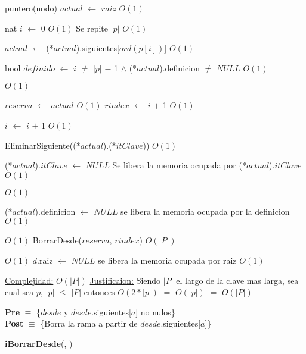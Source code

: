 \begin{Algoritmos}
\begin{algorithm}[H]
\begin{algorithmic}[1]
\State puntero(nodo) $actual$ $\gets$ $raiz$ \Comment $O(1)$

\State nat $i$ $\gets$ 0 \Comment $O(1)$
   \Comment Se repite $|p|$ $O(1)$



	\State $actual$ $\gets$ (*$actual$).siguientes[$ord(p[i])$] \Comment $O(1)$

	\State bool $definido$ $\gets$ $i$ $\neq$ $|p|$ $-$ 1 $\land$ (*$actual$).definicion $\neq$ $NULL$ \Comment $O(1)$

	 \Comment $O(1)$

	\State $reserva$ $\gets$ $actual$ \Comment $O(1)$
	\State $rindex$ $\gets$ $i$ $+$ 1 \Comment $O(1)$

	\EndIf

	\State $i$ $\gets$ $i$ $+$ 1 \Comment $O(1)$
\EndWhile


\State EliminarSiguiente((*$actual$).(*$itClave$)) \Comment $O(1)$

\State (*$actual$).$itClave$ $\gets$ $NULL$ \Comment Se libera la memoria ocupada por (*$actual$).$itClave$ $O(1)$

 \Comment $O(1)$

	\State (*$actual$).definicion $\gets$ $NULL$ \Comment se libera la memoria ocupada por la definicion $O(1)$

\EndIf

 \Comment $O(1)$
	\State BorrarDesde($reserva$, $rindex$) \Comment $O(|P|)$
\EndIf


 \Comment $O(1)$
	\State $d$.raiz $\gets$ $NULL$ \Comment se libera la memoria ocupada por raiz $O(1)$
\EndIf


\medskip
\State \underline{Complejidad:} $O(|P|)$
\State \underline{Justificaion:} Siendo $|P|$ el largo de la clave mas larga, sea cual sea $p$, $|p|$ $\leq$ $|P|$ entonces $O(2*|p|)$ $=$	$O(|p|)$ $=$ $O(|P|)$

\end{algorithmic}
\end{algorithm}

\pagebreak

\textbf{Pre} $\equiv$ \{$desde$ y $desde$.siguientes[$a$] no nulos\}\\%
\textbf{Post} $\equiv$ \{Borra la rama a partir de $desde$.siguientes[$a$]\}%


\begin{algorithm}[H]
{\textbf{iBorrarDesde}(}, )
\begin{algorithmic}[1]


\end{algorithmic}
\end{algorithm}
\end{Algoritmos}
